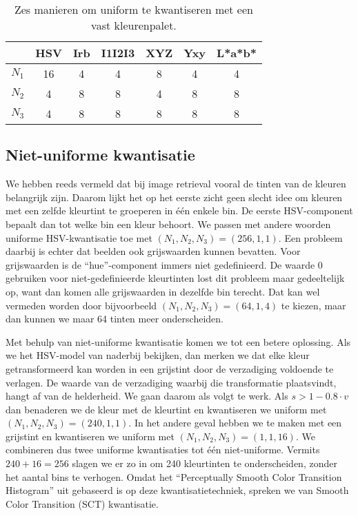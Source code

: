 \begin{table}[tbp]
\begin{center}
\begin{tabular}{|c|cccccc|}
\hline
 		& HSV & Irb & I1I2I3 & XYZ & Yxy & L*a*b* \\
\hline
$N_1$ 	& 16 & 4 & 4 & 8 & 4 & 4 \\
$N_2$	& 4  & 8 & 8 & 4 & 8 & 8 \\
$N_3$	& 4  & 8 & 8 & 8 & 8 & 8 \\
\hline
\end{tabular}
\caption{\label{tab:uniforme_kwantisatie}Zes manieren om uniform te kwantiseren met een vast kleurenpalet.}
\end{center}
\end{table}


\subsection{Niet-uniforme kwantisatie}

We hebben reeds vermeld dat bij image retrieval vooral de tinten van de kleuren belangrijk zijn. Daarom 
lijkt het op het eerste zicht geen slecht idee om kleuren met een zelfde kleurtint te groeperen in 
\'e\'en enkele bin. De eerste HSV-component bepaalt dan tot welke bin een kleur behoort. We passen
met andere woorden uniforme HSV-kwantisatie toe met $(N_1,N_2,N_3)=(256,1,1)$. Een probleem daarbij 
is echter dat beelden ook grijswaarden kunnen bevatten. Voor grijswaarden is de ``hue''-component immers 
niet gedefinieerd. De waarde 0 gebruiken voor niet-gedefinieerde kleurtinten lost dit probleem maar 
gedeeltelijk op, want dan komen alle grijswaarden in dezelfde bin terecht. Dat kan wel vermeden worden 
door bijvoorbeeld $(N_1,N_2,N_3)=(64,1,4)$ te kiezen, maar dan kunnen we maar 64 tinten meer onderscheiden.

Met behulp van niet-uniforme kwantisatie komen we tot een betere oplossing. Als we het HSV-model van naderbij
bekijken, dan merken we dat elke kleur getransformeerd kan worden in een grijstint door de verzadiging
voldoende te verlagen. De waarde van de verzadiging waarbij die transformatie plaatsvindt, hangt af
van de helderheid. We gaan daarom als volgt te werk. Als $s > 1 - 0.8 \cdot v$ dan benaderen we de kleur
met de kleurtint en kwantiseren we uniform met $(N_1,N_2,N_3)=(240,1,1)$. In het andere geval hebben we
te maken met een grijstint en kwantiseren we uniform met $(N_1,N_2,N_3)=(1,1,16)$. We combineren dus
twee uniforme kwantisaties tot \'e\'en niet-uniforme. Vermits $240 + 16 = 256$
slagen we er zo in om 240 kleurtinten te onderscheiden, zonder het aantal bins te verhogen. Omdat het
``Perceptually Smooth Color Transition Histogram'' uit \cite{sural:perceptually_smooth_histogram} 
gebaseerd is op deze kwantisatietechniek, spreken we van Smooth Color Transition (SCT) kwantisatie.  

